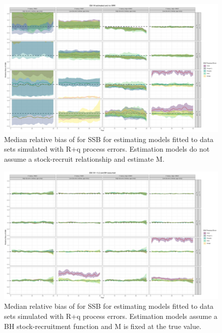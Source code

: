 \documentclass[
  12pt,
]{article}
\begin{document}
\begin{landscape}
\begin{figure}
\caption{Median relative bias of for SSB for estimating models fitted to data sets simulated with R+q process errors. Estimation models do not assume a stock-recruit relationship and estimate M.}\label{q_om_em_R_ME_relbias_ssb}
\begin{center}
\includegraphics[width = \textwidth]{q_om_R_ME_relbias_ssb.png}
\end{center}
\end{figure}
\end{landscape}

\begin{landscape}
\begin{figure}
\caption{Median relative bias of for SSB for estimating models fitted to data sets simulated with R+q process errors. Estimation models assume a BH stock-recruitment function and M is fixed at the true value.}\label{q_om_em_BH_MF_relbias_ssb}
\begin{center}
\includegraphics[width = \textwidth]{q_om_BH_MF_relbias_ssb.png}
\end{center}
\end{figure}
\end{landscape}
\end{document}
